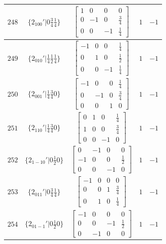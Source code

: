 \documentclass[fleqn,8pt]{jsarticle}
\begin{document}
\begin{longtable}{ccccc}
$ 248 $ & $ \{2{}_{100}{}'|0 \frac{3}{4} \frac{1}{4}\} $ & $ \begin{bmatrix} 1 & 0 & 0 & 0 \\ 0 & -1 & 0 & \frac{3}{4} \\ 0 & 0 & -1 & \frac{1}{4} \end{bmatrix} $ & $ 1 $ & $ -1 $ \\ \hline
$ 249 $ & $ \{2{}_{010}{}'|\frac{1}{4} \frac{1}{2} \frac{1}{4}\} $ & $ \begin{bmatrix} -1 & 0 & 0 & \frac{1}{4} \\ 0 & 1 & 0 & \frac{1}{2} \\ 0 & 0 & -1 & \frac{1}{4} \end{bmatrix} $ & $ 1 $ & $ -1 $ \\ \hline
$ 250 $ & $ \{2{}_{001}{}'|\frac{1}{4} \frac{3}{4} 0\} $ & $ \begin{bmatrix} -1 & 0 & 0 & \frac{1}{4} \\ 0 & -1 & 0 & \frac{3}{4} \\ 0 & 0 & 1 & 0 \end{bmatrix} $ & $ 1 $ & $ -1 $ \\ \hline
$ 251 $ & $ \{2{}_{110}{}'|\frac{1}{4} \frac{3}{4} 0\} $ & $ \begin{bmatrix} 0 & 1 & 0 & \frac{1}{4} \\ 1 & 0 & 0 & \frac{3}{4} \\ 0 & 0 & -1 & 0 \end{bmatrix} $ & $ 1 $ & $ -1 $ \\ \hline
$ 252 $ & $ \{2{}_{1-10}{}'|0 \frac{1}{2} 0\} $ & $ \begin{bmatrix} 0 & -1 & 0 & 0 \\ -1 & 0 & 0 & \frac{1}{2} \\ 0 & 0 & -1 & 0 \end{bmatrix} $ & $ 1 $ & $ -1 $ \\ \hline
$ 253 $ & $ \{2{}_{011}{}'|0 \frac{3}{4} \frac{1}{4}\} $ & $ \begin{bmatrix} -1 & 0 & 0 & 0 \\ 0 & 0 & 1 & \frac{3}{4} \\ 0 & 1 & 0 & \frac{1}{4} \end{bmatrix} $ & $ 1 $ & $ -1 $ \\ \hline
$ 254 $ & $ \{2{}_{01-1}{}'|0 \frac{1}{2} 0\} $ & $ \begin{bmatrix} -1 & 0 & 0 & 0 \\ 0 & 0 & -1 & \frac{1}{2} \\ 0 & -1 & 0 & 0 \end{bmatrix} $ & $ 1 $ & $ -1 $ \\ \hline

\end{longtable}
\end{document}
